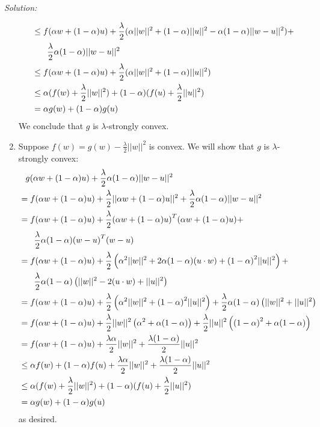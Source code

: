 \documentclass[
10pt, %
a4paper, %
oneside, %
headinclude,footinclude, %
BCOR5mm, %
]{scrartcl}
\newenvironment{solution}
               {\textit{Solution:}}
               {}
\begin{document}
\begin{solution}
\begin{enumerate}[label= (\alph*)]
\begin{align*}
        &\leq f(\alpha w + (1-\alpha)u) + \frac{\lambda}{2}(\alpha||w||^2 + (1-\alpha)||u||^2 - \alpha(1-\alpha)||w-u||^2) + \\
        &\hphantom{\leq} \quad \frac{\lambda}{2}\alpha(1-\alpha)||w-u||^2 \\
        &\leq f(\alpha w + (1-\alpha)u) + \frac{\lambda}{2}(\alpha||w||^2 + (1-\alpha)||u||^2) \\
        &\leq \alpha (f(w) + \frac{\lambda}{2}||w||^2) + (1-\alpha)(f(u) + \frac{\lambda}{2}||u||^2) \\
        &= \alpha g(w) + (1-\alpha)g(u)
      \end{align*}
        We conclude that $g$ is $\lambda$-strongly convex.
      \item Suppose $f(w) = g(w) - \frac{\lambda}{2}||w||^2$ is convex. We will show that $g$ is $\lambda$-strongly convex:
        \begin{align*}
          &\hphantom{=} g(\alpha w + (1-\alpha)u) + \frac{\lambda}{2}\alpha(1-\alpha)||w-u||^2 \\
          &= f(\alpha w + (1-\alpha)u) + \frac{\lambda}{2}||\alpha w + (1-\alpha) u||^2 + \frac{\lambda}{2}\alpha(1-\alpha)||w-u||^2 \\
          &= f(\alpha w + (1-\alpha)u) + \frac{\lambda}{2}{(\alpha w + (1-\alpha) u)}^T(\alpha w + (1-\alpha) u) + \\
          &\hphantom{=} \quad \frac{\lambda}{2}\alpha(1-\alpha){(w-u)}^T(w-u) \\
          &= f(\alpha w + (1-\alpha)u) + \frac{\lambda}{2}\left(\alpha^2||w||^2+2\alpha(1-\alpha)(u\cdot w) + {(1-\alpha)}^2||u||^2\right) + \\
          &\hphantom{=} \quad\frac{\lambda}{2}\alpha(1-\alpha)\left(||w||^2 - 2(u\cdot w) + ||u||^2\right) \\
          &= f(\alpha w + (1-\alpha)u) + \frac{\lambda}{2}\left(\alpha^2||w||^2 + {(1-\alpha)}^2||u||^2\right) + \frac{\lambda}{2}\alpha(1-\alpha)\left(||w||^2 + ||u||^2\right) \\
          &= f(\alpha w + (1-\alpha)u) + \frac{\lambda}{2}||w||^2\left(\alpha^2 + \alpha(1-\alpha)\right) + \frac{\lambda}{2}||u||^2\left({(1-\alpha)}^2 + \alpha(1-\alpha)\right) \\
          &= f(\alpha w + (1-\alpha)u) + \frac{\lambda\alpha}{2}||w||^2 + \frac{\lambda(1-\alpha)}{2}||u||^2 \\
          &\leq \alpha f(w) + (1-\alpha)f(u) + \frac{\lambda\alpha}{2}||w||^2 + \frac{\lambda(1-\alpha)}{2}||u||^2 \\
          &\leq \alpha (f(w) + \frac{\lambda}{2}||w||^2) + (1-\alpha)(f(u) + \frac{\lambda}{2}||u||^2) \\
          &= \alpha g(w) + (1-\alpha)g(u)
        \end{align*}
        as desired.


\end{enumerate}
\end{solution}
\end{document}
